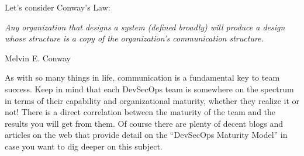 \justify{}
Let's consider Conway's Law:

\begin{displayquote}
    \emph{Any organization that designs a system (defined broadly) will produce a design whose structure is a copy of the
organization's communication structure.}

Melvin E. Conway
\end{displayquote}

\justify{}
As with so many things in life, communication is a fundamental key to team success. Keep in mind that each DevSecOps
team is somewhere on the spectrum in terms of their capability and organizational maturity, whether they realize it or not!
There is a direct correlation between the maturity of the team and the results you will get from them. Of course there are
plenty of decent blogs and articles on the web that provide detail on the ``DevSecOps Maturity Model'' in case you want to
dig deeper on this subject.
